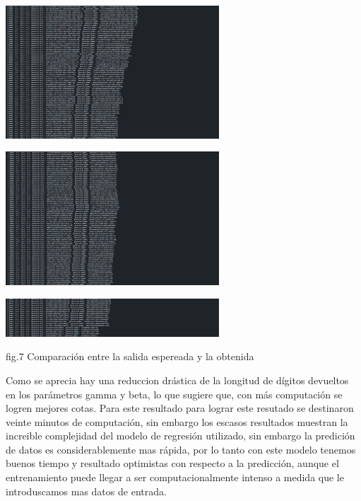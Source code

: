     \begin{center}
        
        \includegraphics[width=0.6\textwidth]{images/1.png}

        \includegraphics[width=0.6\textwidth]{images/2.png}
        
        \includegraphics[width=0.6\textwidth]{images/3.png}
        \begin{center}
            fig.7 Comparación entre la salida espereada y la obtenida
        \end{center} 

\end{center}

Como se aprecia hay una reduccion drástica de la longitud de dígitos devueltos en los parámetros gamma y beta, lo que sugiere que, con más computación se logren 
mejores cotas. Para este resultado para lograr este resutado se destinaron veinte minutos de computación, sin embargo los escasos resultados muestran la increible 
complejidad del modelo de regresión utilizado, sin embargo la predición de datos es considerablemente mas rápida, por lo tanto con este modelo tenemos buenos tiempo 
y resultado optimistas con respecto a la predicción, aunque el entrenamiento puede llegar a ser computacionalmente intenso a medida que le introduscamos mas datos de entrada.

